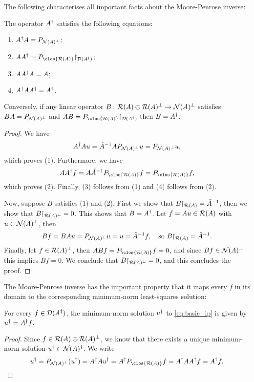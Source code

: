 The following characterises all important facts about the Moore-Penrose inverse: 
\begin{theorem} \label{thm:mp_equations}
    The operator $A^\dagger$ satisfies the following equations: 
    \begin{enumerate}[(1)]
        \item $A^\dagger A = P_{\operatorname{\mathcal N}(A)^\perp}$; 
        \item $AA\D = P_{\clos{\Ran(A)}}\restr_{
        \Dom(A\D)}$; 
        \item $AA^\dagger A = A$;
        \item $A^\dagger AA^\dagger = A^\dagger$. 
    \end{enumerate}

Conversely, if any linear operator $B \colon \operatorname{\mathcal R}(A) \oplus \operatorname{\mathcal R}(A)^\perp \to \operatorname{\mathcal N}(A)^\perp$ satisfies $BA = P_{\operatorname{\mathcal N}(A)^\perp}$ and $AB = P_{\clos{\Ran(A)}}\restr_{\Dom(A\D)}$ then $B = A^\dagger$.  
\end{theorem}

\begin{proof}
    We have 
    \[
    A^\dagger A u = \tilde A^{-1} A P_{\operatorname{\mathcal N}(A)^\perp} u = P_{\operatorname{\mathcal N}(A)^\perp} u, 
    \]
    which proves (1). Furthermore, we have
    \[
    AA\D f = A \tilde A^{-1} P_{\clos{\Ran(A)}}f = P_{\clos{\Ran(A)}} f,
    \]
    which proves (2). Finally, (3) follows from (1) and (4) follows from (2). 
    
    Now, suppose $B$ satisfies (1) and (2). First we show that $B\mathord\restriction_{\operatorname{\mathcal R}(A)} = \tilde A^{-1}$, then we show that $B \mathord\restriction_{\operatorname{\mathcal R}(A)^\perp} = 0$. This shows that $B = A^\dagger$. 
    Let $f = Au \in \operatorname{\mathcal R}(A)$ with $u \in \operatorname{\mathcal N}(A)^\perp$, then
    \[
    Bf = BAu = P_{\operatorname{\mathcal N}(A)^\perp} u = u = \tilde A^{-1} f, \quad\text{so } B\mathord\restriction_{\operatorname{\mathcal R}(A)} = \tilde A^{-1}. 
    \]
    Finally, let $f \in \operatorname{\mathcal R}(A)^\perp$, then $ABf = P_{\clos{\Ran(A)}} f = 0$, and since $Bf \in \operatorname{\mathcal N}(A)^\perp$ this implies $Bf = 0$. We conclude that $B\mathord\restriction_{\operatorname{\mathcal R}(A)^\perp} = 0$, and this concludes the proof. 
\end{proof}

The Moore-Penrose inverse has the important property that it maps every $f$ in its domain to the corresponding minimum-norm least-squares solution:
\begin{theorem}
    For every $f \in \operatorname{\mathcal D}(A^\dagger)$, the minimum-norm solution $u^\dagger$ to \cref{eq:basic_ip} is given by $u^\dagger = A^\dagger f$. 
\end{theorem}

\begin{proof}
    Since $f \in \operatorname{\mathcal R}(A) \oplus \operatorname{\mathcal R}(A)^\perp$, we know that there exists a unique minimum-norm solution $u^\dagger \in \operatorname{\mathcal N}(A)^\dagger$. We write
    \[
    u\D = P_{\Nul(A)\P}(u\D) = A\D A u\D = A\D P_{\clos{\Ran(A)}} f = A\D A A\D f = A\D f. 
    \]
\end{proof}

